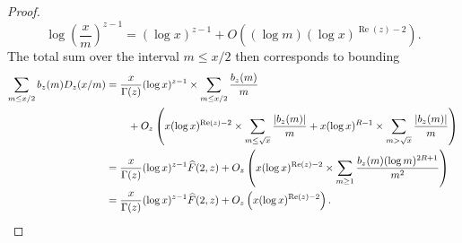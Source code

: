 \documentclass[11pt,reqno,a4letter]{article}
\numberwithin{figure}{section}
\numberwithin{table}{section}
\theoremstyle{plain}
\numberwithin{theorem}{section}
\theoremstyle{definition}
\renewcommand{\Re}{\operatorname{Re}}
\begin{document}
\begin{proof}
\[
\log\left(\frac{x}{m}\right)^{z-1} = (\log x)^{z-1} + 
     O\left((\log m) (\log x)^{\Re(z) - 2}\right). 
\]
The total sum over the interval $m \leq x/2$ then corresponds to bounding 
\begin{align*} 
\sum_{m \leq x/2} b_z(m) D_z(x/m) & = \frac{x}{\Gamma(z)} (\log x)^{z-1} \times 
     \sum_{m \leq x/2} \frac{b_z(m)}{m} \\ 
     & \phantom{=\quad\ } + 
     O_z\left(x (\log x)^{\Re(z)-2} \times \sum_{m \leq \sqrt{x}} \frac{|b_z(m)|}{m} + 
     x (\log x)^{R-1} \times \sum_{m > \sqrt{x}} \frac{|b_z(m)|}{m}\right) \\ 
     & = \frac{x}{\Gamma(z)} (\log x)^{z-1} \widehat{F}(2, z) + O_z\left( 
     x (\log x)^{\Re(z)-2} \times \sum_{m \geq 1} \frac{b_z(m) (\log m)^{2R+1}}{m^2} 
     \right) \\ 
     & = \frac{x}{\Gamma(z)} (\log x)^{z-1} \widehat{F}(2, z) + O_z\left( 
     x (\log x)^{\Re(z)-2}\right). 
     \qedhere  
\end{align*} 
\end{proof} 
\end{document}
